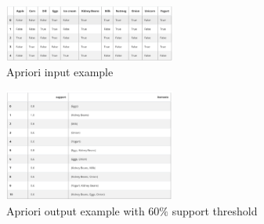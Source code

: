 \begin{figure}[H]
      \centering
      \includegraphics[width=0.5\textwidth]{images/apriori1.png}
      \caption{Apriori input example \parencite{Apriorim11:online} }
      \label{fig:apriori1}
  \end{figure}

\begin{figure}[H]
      \centering
      \includegraphics[width=0.5\textwidth]{images/apriori2.png}
      \caption{Apriori output example with $60\%$ support threshold \parencite{Apriorim11:online}}
      \label{fig:apriori2}
  \end{figure}

